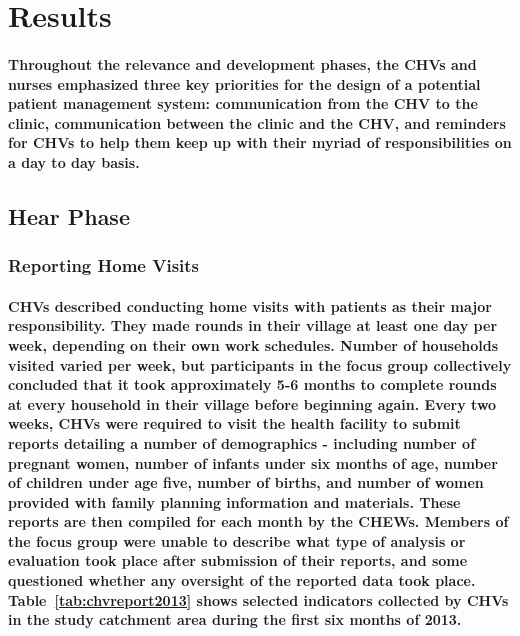 \section{Results}
\paragraph{Throughout the relevance and development phases, the CHVs and nurses emphasized three key priorities for the design of a potential patient management system: communication from the CHV to the clinic, communication between the clinic and the CHV, and reminders for CHVs to help them keep up with their myriad of responsibilities on a day to day basis.} 


\subsection{Hear Phase}

\subsubsection{Reporting Home Visits}
\paragraph{CHVs described conducting home visits with patients as their major responsibility. They made rounds in their village at least one day per week, depending on their own work schedules. Number of households visited varied per week, but participants in the focus group collectively concluded that it took approximately 5-6 months to complete rounds at every household in their village before beginning again. Every two weeks, CHVs were required to visit the health facility to submit reports detailing a number of demographics - including number of pregnant women, number of infants under six months of age, number of children under age five, number of births, and number of women provided with family planning information and materials. These reports are then compiled for each month by the CHEWs. Members of the focus group were unable to describe what type of analysis or evaluation took place after submission of their reports, and some questioned whether any oversight of the reported data took place.  Table~\ref{tab:chvreport2013} shows selected indicators collected by CHVs in the study catchment area during the first six months of 2013. }

